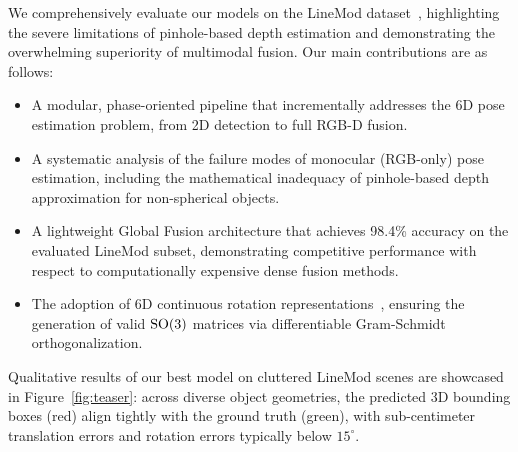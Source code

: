 We comprehensively evaluate our models on the LineMod dataset~\cite{hinterstoisser2012model}, highlighting the severe limitations of pinhole-based depth estimation and demonstrating the overwhelming superiority of multimodal fusion. Our main contributions are as follows:

\begin{itemize}
    \item A modular, phase-oriented pipeline that incrementally addresses the 6D pose estimation problem, from 2D detection to full RGB-D fusion.
    \item A systematic analysis of the failure modes of monocular (RGB-only) pose estimation, including the mathematical inadequacy of pinhole-based depth approximation for non-spherical objects.
    \item A lightweight Global Fusion architecture that achieves 98.4\% accuracy on the evaluated LineMod subset, demonstrating competitive performance with respect to computationally expensive dense fusion methods.
    \item The adoption of 6D continuous rotation representations~\cite{zhou2019continuity}, ensuring the generation of valid $\mathrm{SO}(3)$ matrices via differentiable Gram-Schmidt orthogonalization.
\end{itemize}

Qualitative results of our best model on cluttered LineMod scenes are showcased in Figure~\ref{fig:teaser}: across diverse object geometries, the predicted 3D bounding boxes (red) align tightly with the ground truth (green), with sub-centimeter translation errors and rotation errors typically below $15^\circ$.

